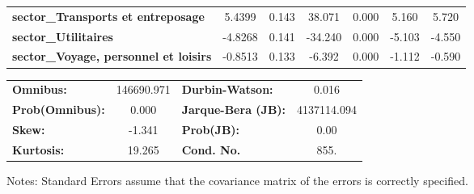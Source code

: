 \begin{center}
\begin{tabular}{lcccccc}
\textbf{sector\_Transports et entreposage}                            &       5.4399  &        0.143     &    38.071  &         0.000        &        5.160    &        5.720     \\
\textbf{sector\_Utilitaires}                                          &      -4.8268  &        0.141     &   -34.240  &         0.000        &       -5.103    &       -4.550     \\
\textbf{sector\_Voyage, personnel et loisirs}                         &      -0.8513  &        0.133     &    -6.392  &         0.000        &       -1.112    &       -0.590     \\
\bottomrule
\end{tabular}
\begin{tabular}{lclc}
\textbf{Omnibus:}       & 146690.971 & \textbf{  Durbin-Watson:     } &      0.016   \\
\textbf{Prob(Omnibus):} &    0.000   & \textbf{  Jarque-Bera (JB):  } & 4137114.094  \\
\textbf{Skew:}          &   -1.341   & \textbf{  Prob(JB):          } &       0.00   \\
\textbf{Kurtosis:}      &   19.265   & \textbf{  Cond. No.          } &       855.   \\
\bottomrule
\end{tabular}
\end{center}

Notes: \newline
 [1] Standard Errors assume that the covariance matrix of the errors is correctly specified.
